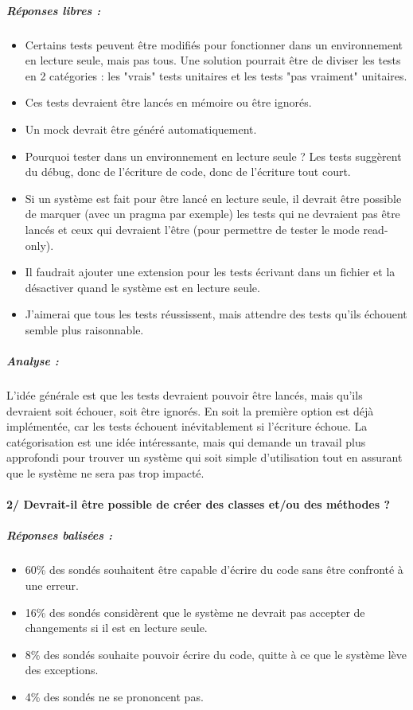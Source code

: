 \subparagraph{Réponses libres :}
\begin{itemize}
	\item Certains tests peuvent être modifiés pour fonctionner dans un environnement en lecture seule, mais pas tous. Une solution pourrait être de diviser les tests en 2 catégories : les "vrais" tests unitaires et les tests "pas vraiment" unitaires.
	\item Ces tests devraient être lancés en mémoire ou être ignorés.
	\item Un mock devrait être généré automatiquement.
	\item Pourquoi tester dans un environnement en lecture seule ? Les tests suggèrent du débug, donc de l'écriture de code, donc de l'écriture tout court.
	\item Si un système est fait pour être lancé en lecture seule, il devrait être possible de marquer (avec un pragma par exemple) les tests qui ne devraient pas être lancés et ceux qui devraient l'être (pour permettre de tester le mode read-only).
	\item Il faudrait ajouter une extension pour les tests écrivant dans un fichier et la désactiver quand le système est en lecture seule.
	\item J'aimerai que tous les tests réussissent, mais attendre des tests qu'ils échouent semble plus raisonnable.
\end{itemize}

\subparagraph{Analyse :}
L'idée générale est que les tests devraient pouvoir être lancés, mais qu'ils devraient soit échouer, soit être ignorés. En soit la première option est déjà implémentée, car les tests échouent inévitablement si l'écriture échoue. La catégorisation est une idée intéressante, mais qui demande un travail plus approfondi pour trouver un système qui soit simple d'utilisation tout en assurant que le système ne sera pas trop impacté.

\paragraph{2/ Devrait-il être possible de créer des classes et/ou des méthodes ?}
\subparagraph{Réponses balisées :}
\begin{itemize}
	\item 60\% des sondés souhaitent être capable d'écrire du code sans être confronté à une erreur.
	\item 16\% des sondés considèrent que le système ne devrait pas accepter de changements si il est en lecture seule.
	\item 8\% des sondés souhaite pouvoir écrire du code, quitte à ce que le système lève des exceptions.
	\item 4\% des sondés ne se prononcent pas.
\end{itemize}

